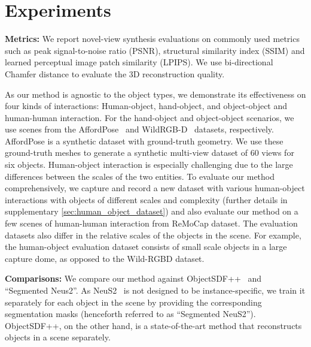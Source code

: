 \section{Experiments} 





\par
\noindent 
\textbf{Metrics:} We report novel-view synthesis evaluations on commonly used metrics such as peak signal-to-noise ratio (PSNR), structural similarity index (SSIM) and learned perceptual image patch similarity (LPIPS).
We use bi-directional Chamfer distance to evaluate the 3D reconstruction quality. 
\par
As our method is agnostic to the object types, we demonstrate its effectiveness on four kinds of interactions: Human-object, hand-object, and object-object and human-human interaction. 
For the hand-object and object-object scenarios, we use scenes from the AffordPose~\cite{affordpose} and WildRGB-D~\cite{xia2024rgbd} datasets, respectively.
AffordPose is a synthetic dataset with ground-truth geometry. 
We use these ground-truth meshes to generate a synthetic multi-view dataset of 60 views for six objects. 
Human-object interaction is especially challenging due to the large differences between the scales of the two entities. 
To evaluate our method comprehensively, we capture and record a new dataset with various human-object interactions with objects of different scales and complexity (further details in supplementary \cref{sec:human_object_dataset}) and also evaluate our method on a few scenes of human-human interaction from ReMoCap\cite{ghosh2024remos} dataset.
The evaluation datasets also differ in the relative scales of the objects in the scene. 
For example, the human-object evaluation dataset consists of small scale objects in a large capture dome, as opposed to the Wild-RGBD dataset.
\par 
\noindent \textbf{Comparisons:} We compare our method against ObjectSDF++~\cite{Wu2023objectsdfplus} and ``Segmented Neus2''. 
As NeuS2~\cite{neus2} is not designed to be instance-specific, we train it separately for each object in the scene by providing the corresponding segmentation masks (henceforth referred to as ``Segmented NeuS2''). 
ObjectSDF++, on the other hand, is a state-of-the-art method that reconstructs objects in a scene separately.%

